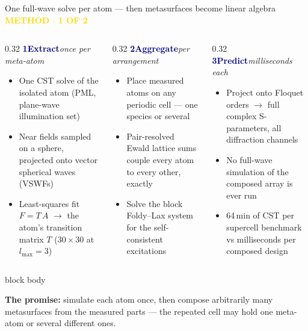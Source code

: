 \documentclass[10pt,aspectratio=169]{beamer}
\newcommand{\kicker}[1]{{\footnotesize\bfseries\textcolor{gold}{#1}}\\[-0.4ex]}
\begin{document}
\begin{frame}{One full-wave solve per atom --- then metasurfaces become linear algebra}
  \kicker{METHOD  $\cdot$  1 OF 2}
  \begin{columns}[t]
    \begin{column}{0.32\textwidth}
      \textcolor{navy}{\textbf{1\quad Extract}}\hfill{\scriptsize\textit{\textcolor{golddk}{once per meta-atom}}}
      \begin{itemize}\footnotesize
        \item One CST solve of the isolated atom (PML, plane-wave illumination set)
        \item Near fields sampled on a sphere, projected onto vector spherical waves (VSWFs)
        \item Least-squares fit $F = T\,A$ $\rightarrow$ the atom's transition matrix $T$ ($30\times 30$ at $l_{\max}=3$)
      \end{itemize}
    \end{column}
    \begin{column}{0.32\textwidth}
      \textcolor{navy}{\textbf{2\quad Aggregate}}\hfill{\scriptsize\textit{\textcolor{golddk}{per arrangement}}}
      \begin{itemize}\footnotesize
        \item Place measured atoms on any periodic cell --- one species or several
        \item Pair-resolved Ewald lattice sums couple every atom to every other, exactly
        \item Solve the block Foldy--Lax system for the self-consistent excitations
      \end{itemize}
    \end{column}
    \begin{column}{0.32\textwidth}
      \textcolor{navy}{\textbf{3\quad Predict}}\hfill{\scriptsize\textit{\textcolor{golddk}{milliseconds each}}}
      \begin{itemize}\footnotesize
        \item Project onto Floquet orders $\rightarrow$ full complex S-parameters, all diffraction channels
        \item No full-wave simulation of the composed array is ever run
        \item 64\,min of CST per supercell benchmark vs milliseconds per composed design
      \end{itemize}
    \end{column}
  \end{columns}
  \vspace{2ex}
  \begin{beamercolorbox}[rounded=true,sep=6pt]{block body}
    \colorbox{cardgold}{\parbox{0.96\textwidth}{\small\textbf{\textcolor{golddk}{The promise:}}
    simulate each atom once, then compose arbitrarily many metasurfaces from the measured parts ---
    the repeated cell may hold one meta-atom or several different ones.}}
  \end{beamercolorbox}
\end{frame}
\end{document}
